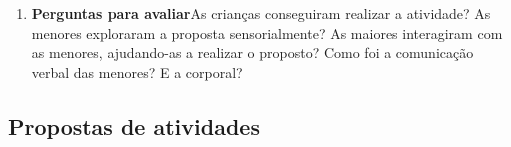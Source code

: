 \documentclass[11pt]{extarticle}
\begin{document}
\begin{enumerate}


\item \textbf{Perguntas para avaliar}\quad As crianças conseguiram realizar a atividade? As menores exploraram a proposta sensorialmente? As maiores interagiram com as menores, ajudando-as a realizar o proposto? Como foi a comunicação verbal das menores? E a corporal? 
\end{enumerate}



\subsection{Propostas de atividades}



\end{document}
